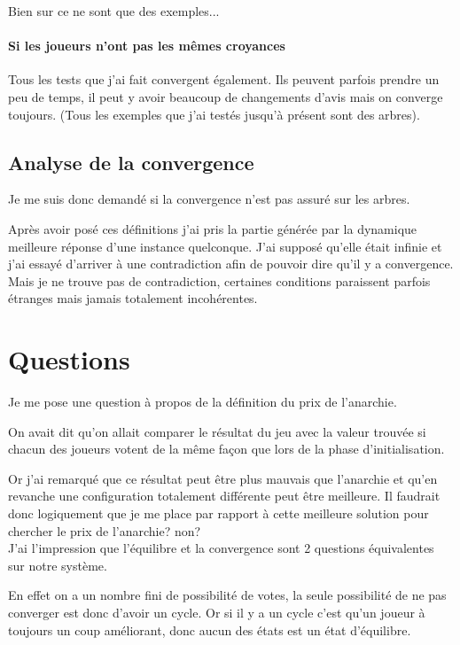 \documentclass[12pt]{article}
\theoremstyle{defi}
\theoremstyle{not}
\theoremstyle{prob}
\begin{document}
        Bien sur ce ne sont que des exemples...


      \paragraph{Si les joueurs n'ont pas les mêmes croyances}
        Tous les tests que j'ai fait convergent également. Ils peuvent parfois prendre un peu de temps, il peut y avoir beaucoup de changements d'avis mais on converge toujours.
        (Tous les exemples que j'ai testés jusqu'à présent sont des arbres).

    \subsection{Analyse de la convergence}
      Je me suis donc demandé si la convergence n'est pas assuré sur les arbres.



      Après avoir posé ces définitions j'ai pris la partie générée par la dynamique meilleure réponse d'une instance quelconque.
      J'ai supposé qu'elle était infinie et j'ai essayé d'arriver à une contradiction afin de pouvoir dire qu'il y a convergence.
      Mais je ne trouve pas de contradiction, certaines conditions paraissent parfois étranges mais jamais totalement incohérentes.

  \section{Questions}
    Je me pose une question à propos de la définition du prix de l'anarchie.

    On avait dit qu'on allait comparer le résultat du jeu avec la valeur trouvée si chacun des joueurs votent de la même façon que lors de la phase d'initialisation.

    Or j'ai remarqué que ce résultat peut être plus mauvais que l'anarchie et qu'en revanche une configuration totalement différente peut être meilleure. Il faudrait donc logiquement que je me place par rapport à cette meilleure solution pour chercher le prix de l'anarchie? non?\\

    \color{blue}
    J'ai l'impression que l'équilibre et la convergence sont 2 questions équivalentes sur notre système.

    En effet on a un nombre fini de possibilité de votes, la seule possibilité de ne pas converger est donc d'avoir un cycle. Or si il y a un cycle c'est qu'un joueur à toujours un coup améliorant, donc aucun des états est un état d'équilibre.
\end{document}
